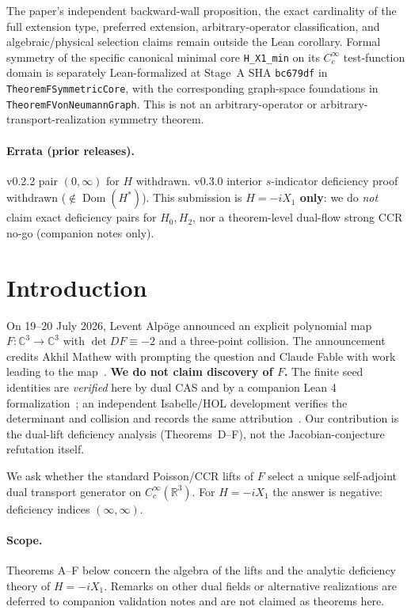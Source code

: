 ﻿\documentclass[11pt]{article}
\begin{document}
The paper's independent backward-wall proposition, the exact cardinality of
the full extension type, preferred extension, arbitrary-operator
classification, and algebraic/physical selection claims remain outside the
Lean corollary.
Formal symmetry of the specific canonical minimal core
\texttt{H\_X1\_min} on its $C_c^\infty$ test-function domain is separately
Lean-formalized at Stage~A SHA \texttt{bc679df} in
\texttt{TheoremF}\allowbreak\texttt{SymmetricCore}, with the corresponding
graph-space foundations in
\texttt{TheoremF}\allowbreak\texttt{VonNeumannGraph}. This is not an arbitrary-operator or
arbitrary-transport-realization symmetry theorem.
\par
\endgroup

\paragraph{Errata (prior releases).}
v0.2.2 pair \((0,\infty)\) for \(H\) withdrawn. v0.3.0 interior \(s\)-indicator deficiency proof withdrawn (\(\notin\operatorname{Dom}(H^*)\)). This submission is \textbf{\(H=-iX_1\) only}: we do \emph{not} claim exact deficiency pairs for \(H_0,H_2\), nor a theorem-level dual-flow strong CCR no-go (companion notes only).

\section{Introduction}
On 19--20 July 2026, Levent Alp\"oge announced an explicit polynomial map \(F:\mathbb{C}^3\to\mathbb{C}^3\) with \(\det DF\equiv-2\) and a three-point collision. The announcement credits Akhil Mathew with prompting the question and Claude Fable with work leading to the map~\cite{Alpoge2026,AFPJacobian}. \textbf{We do not claim discovery of \(F\).} The finite seed identities are \emph{verified} here by dual CAS and by a companion Lean 4 formalization~\cite{FredriksenLean,FredriksenSoft}; an independent Isabelle/HOL development verifies the determinant and collision and records the same attribution~\cite{AFPJacobian}. Our contribution is the dual-lift deficiency analysis (Theorems~D--F), not the Jacobian-conjecture refutation itself.

We ask whether the standard Poisson/CCR lifts of \(F\) select a unique self-adjoint dual transport generator on \(C_c^\infty(\mathbb{R}^3)\). For \(H=-iX_1\) the answer is negative: deficiency indices \((\infty,\infty)\).

\paragraph{Scope.} Theorems A--F below concern the algebra of the lifts and the analytic deficiency theory of \(H=-iX_1\). Remarks on other dual fields or alternative realizations are deferred to companion validation notes and are not claimed as theorems here.
\end{document}
